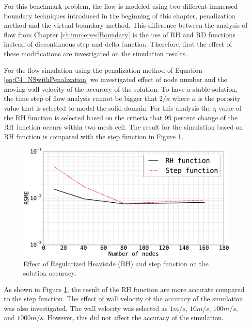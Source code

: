 For this benchmark problem, the flow is modeled using two different immersed boundary techniques introduced in the beginning of this chapter, penalization method and the virtual boundary method. This difference between the analysis of flow from Chapter \ref{ch:immersedBoundary} is the use of RH and RD functions instead of discontinuous step and delta function. Therefore, first the effect of these modifications are investigated on the simulation results.

For the flow simulation using the penalization method of Equation \eqref{eq:C4_NSwithPenalization} we investigated effect of node number and the moving wall velocity of the accuracy of the solution. To have a stable solution, the time step of flow analysis cannot be bigger that $2 / \kappa$ where $\kappa$ is the porosity value that is selected to model the solid domain. For this analysis the $\eta$ value of the RH function is selected based on the criteria that 99 percent change of the RH function occurs within two mesh cell. The result for the simulation based on RH function is compared with the step function in Figure \ref{fig:C4_effectOfRHfunctionOnSimulationResults1Dproblem}.

\begin{figure}[H]
	\centering
	\includegraphics[width=12.00cm]{Chapter_4/figure/effect_of_RH_on_simulation_vs_numberOfNodes_1D_problem.eps}
	\caption{Effect of Regularized Heaviside (RH) and step function on the solution accuracy.}
	\label{fig:C4_effectOfRHfunctionOnSimulationResults1Dproblem}
\end{figure}

As shown in Figure \ref{fig:C4_effectOfRHfunctionOnSimulationResults1Dproblem}, the result of the RH function are more accurate compared to the step function. The effect of wall velocity of the accuracy of the simulation was also investigated. The wall velocity was selected as $1 m/s$, $10 m/s$, $100 m/s$, and $1000 m/s$. However, this did not affect the accuracy of the simulation.

